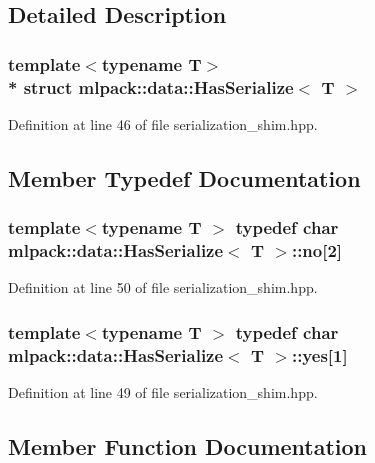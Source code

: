 \subsection{Detailed Description}
\subsubsection*{template$<$typename T$>$\\*
struct mlpack\+::data\+::\+Has\+Serialize$<$ T $>$}



Definition at line 46 of file serialization\+\_\+shim.\+hpp.



\subsection{Member Typedef Documentation}
\subsubsection[{no}]{\setlength{\rightskip}{0pt plus 5cm}template$<$typename T $>$ typedef char {\bf mlpack\+::data\+::\+Has\+Serialize}$<$ T $>$\+::no[2]}\label{structmlpack_1_1data_1_1HasSerialize_a2882b53f3ac9f1e66fd5c9957452a0fe}


Definition at line 50 of file serialization\+\_\+shim.\+hpp.

\subsubsection[{yes}]{\setlength{\rightskip}{0pt plus 5cm}template$<$typename T $>$ typedef char {\bf mlpack\+::data\+::\+Has\+Serialize}$<$ T $>$\+::yes[1]}\label{structmlpack_1_1data_1_1HasSerialize_ae1ded96ae5e44ded6d49c22d51b07b87}


Definition at line 49 of file serialization\+\_\+shim.\+hpp.



\subsection{Member Function Documentation}
